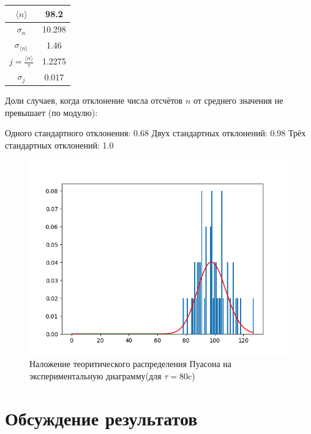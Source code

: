 \documentclass[a4paper, 12pt]{article}
\begin{document}
\begin{table}[!h]
\begin{center}
\begin{tabular}{|c|c|}
\hline
$\langle n\rangle$ & 98.2 \\ \hline
$\sigma_{n}$ & 10.298 \\ \hline
$\sigma_{\langle n\rangle}$ & 1.46 \\ \hline
$j=\frac{\langle n\rangle}{\tau}$ & 1.2275 \\ \hline
$\sigma_{j}$ & 0.017 \\ \hline
\end{tabular}
\end{center}
\end{table}

Доли случаев, когда отклонение числа отсчётов $n$ от среднего значения не превышает (по модулю):

Одного стандартного отклонения: 0.68
Двух стандартных отклонений: 0.98
Трёх стандартных отклонений: 1.0

\begin{figure}[h!]
    \centering
    \includegraphics[width=1\textwidth]{80.png}
    \caption{Наложение теоритического распределения Пуасона на экспериментальную диаграмму(для $\tau = 80$c)}
    \label{fig:my_label}
\end{figure}

\clearpage

\section*{Обсуждение результатов}
\end{document}
